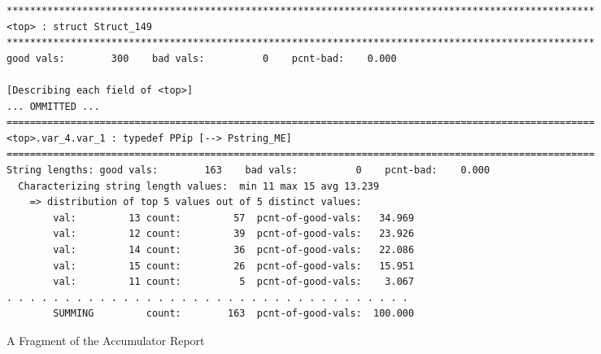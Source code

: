 \documentclass{sig-alternate-sigmod08}
\begin{document}
\begin{figure*}
\begin{center}
{\small
\begin{verbatim}
*****************************************************************************************************
<top> : struct Struct_149
*****************************************************************************************************
good vals:        300    bad vals:          0    pcnt-bad:    0.000

[Describing each field of <top>]
... OMMITTED ...
=====================================================================================================
<top>.var_4.var_1 : typedef PPip [--> Pstring_ME]
=====================================================================================================
String lengths: good vals:        163    bad vals:          0    pcnt-bad:    0.000
  Characterizing string length values:  min 11 max 15 avg 13.239
    => distribution of top 5 values out of 5 distinct values:
        val:         13 count:         57  pcnt-of-good-vals:   34.969
        val:         12 count:         39  pcnt-of-good-vals:   23.926
        val:         14 count:         36  pcnt-of-good-vals:   22.086
        val:         15 count:         26  pcnt-of-good-vals:   15.951
        val:         11 count:          5  pcnt-of-good-vals:    3.067
. . . . . . . . . . . . . . . . . . . . . . . . . . . . . . . . . . .
        SUMMING         count:        163  pcnt-of-good-vals:  100.000

\end{verbatim}
}
\caption{A Fragment of the Accumulator Report}\label{fig-accum-report}
\end{center}
\end{figure*}


\end{document}
